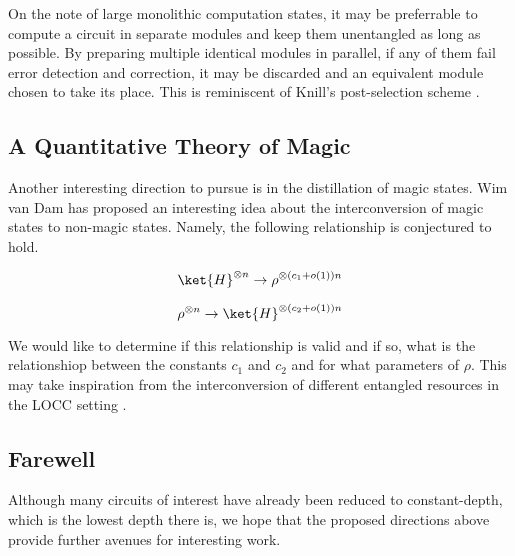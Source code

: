 On the note of large monolithic computation states, it may be preferrable
to compute a circuit in separate modules and keep them unentangled as long
as possible. By preparing multiple identical modules in parallel, if any
of them fail error detection and correction, it may be discarded and an
equivalent module chosen to take its place. This is reminiscent of
Knill's post-selection scheme \cite{Knill2004}.

\subsection{A Quantitative Theory of Magic}

Another interesting direction to pursue is in the distillation of magic
states. 
Wim van Dam has proposed an interesting idea about the interconversion of
magic states to non-magic states. Namely, the following relationship is
conjectured to hold.

\begin{equation}
\ket{H}^{\otimes n} \rightarrow \rho^{\otimes (c_1 + o(1))n}
\end{equation}

\begin{equation}
\rho^{\otimes n} \rightarrow \ket{H}^{\otimes (c_2 + o(1))n}
\end{equation}

We would like to determine if this relationship is valid and if so,
what is the relationshiop between the constants $c_1$
and $c_2$ and for what parameters of $\rho$. This may take inspiration
from the interconversion of different entangled resources in the LOCC
setting \cite{Ambainis2002}.

\subsection{Farewell}

Although many circuits of interest have already been reduced to constant-depth,
which is the lowest depth there is, we hope that the proposed directions above
provide further avenues for interesting work.